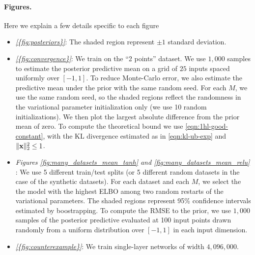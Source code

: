 \documentclass[twoside]{article}
\newcommand{\vx}{\mathbf{x}}
\DeclarePairedDelimiter\norm{\|}{\|}             %
\theoremstyle{theoremstyle}
\begin{document}
\paragraph{Figures.} Here we explain a few details specific to each figure \begin{itemize}
    \item \textit{\cref{{fig:posteriors}}}: The shaded region represent $\pm 1$ standard deviation. 
    
    \item \textit{\cref{{fig:convergence}}}: We train on the ``2 points'' dataset. We use $1{,}000$ samples to estimate the posterior predictive mean on a grid of $25$ inputs spaced uniformly over $[-1,1]$. To reduce Monte-Carlo error, we also estimate the predictive mean under the prior with the same random seed. For each $M$, we use the same random seed, so the shaded regions reflect the randomness in the variational parameter initialization only (we use 10 random initializations). We then plot the largest absolute difference from the prior mean of zero. To compute the theoretical bound we use \cref{eqn:1hl-good-constant}, with the KL divergence estimated as in \cref{eqn:kl-ub-exp} and $\norm{\vx}_2^2\le 1$. 
    
    
    \item \textit{Figures \ref{fig:many_datasets_mean_tanh} and \ref{fig:many_datasets_mean_relu} }: We use 5 different train/test splits (or 5 different random datasets in the case of the synthetic datasets). For each dataset and each $M$, we select the the model with the highest ELBO among two random restarts of the variational parameters.  The shaded regions represent 95\% confidence intervals estimated by boostrapping. To compute the RMSE to the prior, we use $1{,}000$ samples of the posterior predictive evaluated at 100 input points drawn randomly from a uniform distribution over $[-1,1]$ in each input dimension. 
    
    \item \textit{\cref{{fig:counterexample}}}: We train single-layer networks of width $4{,}096{,}000$.
    
\end{itemize}
\end{document}
